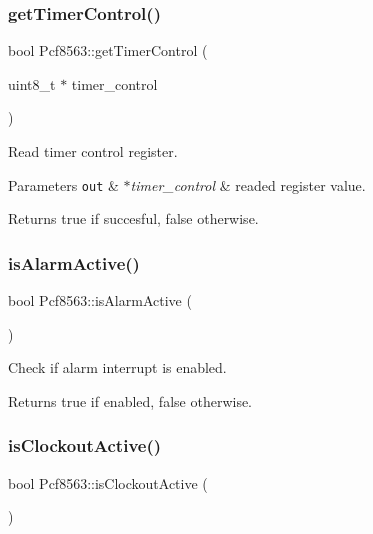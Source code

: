\subsubsection{\texorpdfstring{get\+Timer\+Control()}{getTimerControl()}}
{\footnotesize\ttfamily bool Pcf8563\+::get\+Timer\+Control (\begin{DoxyParamCaption}\item[{uint8\+\_\+t $\ast$}]{timer\+\_\+control }\end{DoxyParamCaption})}



Read timer control register. 


\begin{DoxyParams}[1]{Parameters}
\mbox{\tt out}  & {\em $\ast$timer\+\_\+control} & readed register value. \\
\hline
\end{DoxyParams}
\begin{DoxyReturn}{Returns}
true if succesful, false otherwise. 
\end{DoxyReturn}
\mbox{\label{namespacePcf8563_a23086671303b630318e82e9bef662b44}} 
\subsubsection{\texorpdfstring{is\+Alarm\+Active()}{isAlarmActive()}}
{\footnotesize\ttfamily bool Pcf8563\+::is\+Alarm\+Active (\begin{DoxyParamCaption}{ }\end{DoxyParamCaption})}



Check if alarm interrupt is enabled. 

\begin{DoxyReturn}{Returns}
true if enabled, false otherwise. 
\end{DoxyReturn}
\mbox{\label{namespacePcf8563_ab8ff6484e7a5636187e0212a98f623bf}} 
\subsubsection{\texorpdfstring{is\+Clockout\+Active()}{isClockoutActive()}}
{\footnotesize\ttfamily bool Pcf8563\+::is\+Clockout\+Active (\begin{DoxyParamCaption}{ }\end{DoxyParamCaption})}



